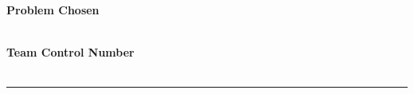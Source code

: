 \documentclass[../mcmpaper]{subfiles}
\begin{document}
	\thispagestyle{empty}
	\begingroup
	\setlength{\parindent}{0pt}
	\begin{minipage}[t]{0.33\linewidth}
		\bfseries\centering%
		Problem Chosen\\[0.7pc]
		{\Huge\textbf{\problem}}\\[2.8pc]
	\end{minipage}%
	\begin{minipage}[t]{0.33\linewidth}
		\centering%
		\textbf{\headset}%
	\end{minipage}%
	\begin{minipage}[t]{0.33\linewidth}
		\centering\bfseries%
		Team Control Number\\[0.7pc]
		{\Huge\textbf{\MCMcontrol}}\\[2.8pc]
	\end{minipage}\par
	\rule{\linewidth}{0.8pt}\par
	\par
	\endgroup
	
\end{document}
